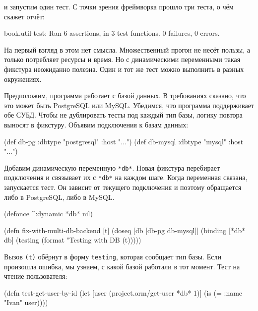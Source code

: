 \noindent
и запустим один тест. С точки зрения фреймворка прошло три теста, о чём скажет
отчёт:

\begin{english}
  \begin{text}
book.util-test: Ran 6 assertions, in 3 test functions.
0 failures, 0 errors.
  \end{text}
\end{english}

На первый взгляд в этом нет смысла. Множественный прогон не несёт пользы, а
только потребляет ресурсы и время. Но с динамическими переменными такая фикстура
неожиданно полезна. Один и тот же тест можно выполнить в разных окружениях.

Предположим, программа работает с базой данных. В требованиях сказано, что это
может быть PostgreSQL или MySQL. Убедимся, что программа поддерживает обе
СУБД. Чтобы не дублировать тесты под каждый тип базы, логику повтора выносят в
фикстуру. Объявим подключения к базам данных:


\begin{english}
  \begin{clojure}
(def db-pg    {:dbtype "postgresql" :host "..."})
(def db-mysql {:dbtype "mysql"      :host "..."})
  \end{clojure}
\end{english}

Добавим динамическую переменную \verb|*db*|. Новая фикстура перебирает
подключения и связывает их с \verb|*db*| на каждом шаге. Когда переменная
связана, запускается тест. Он зависит от текущего подключения и поэтому
обращается либо в PostgreSQL, либо в MySQL.

\begin{english}
  \begin{clojure}
(defonce ^:dynamic *db* nil)

(defn fix-with-multi-db-backend [t]
  (doseq [db [db-pg db-mysql]]
    (binding [*db* db]
      (testing (format "Testing with DB %
        (t)))))
  \end{clojure}
\end{english}

Вызов \verb|(t)| обёрнут в форму \verb|testing|, которая сообщает тип
базы. Если произошла ошибка, мы узнаем, с какой базой работали в тот
момент. Тест на чтение пользователя:

\begin{english}
  \begin{clojure}
(defn test-get-user-by-id
  (let [user (project.orm/get-user *db* 1)]
    (is (= {:name "Ivan"} user))))
  \end{clojure}
\end{english}

